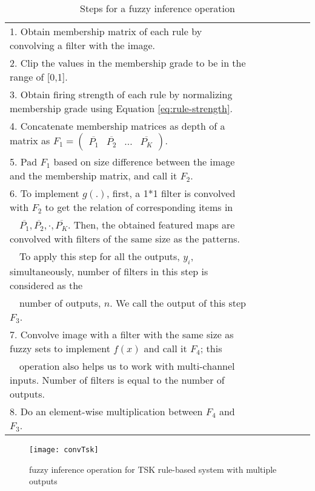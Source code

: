 \documentclass{article}
\begin{document}
\begin{table*}[tb]
\caption{Steps for a fuzzy inference operation}
\label{tab:fuzzyConvOp}
\vskip 0.15in
\begin{center}
\begin{small}
\begin{tabular}{lcccccr}
\toprule
1. Obtain membership matrix of each rule by convolving a filter with the image. \\
2. Clip the values in the membership grade to be in the range of [0,1]. \\
3. Obtain firing strength of each rule by normalizing membership grade using Equation \ref{eq:rule-strength}. \\
4. Concatenate membership matrices as depth of a matrix as $F_1=\begin{pmatrix} \overline{P_1} & \overline{P_2} & ... &\overline{P_K} \end{pmatrix}$. \\
5. Pad $F_1$ based on size difference between the image and the membership matrix, and call it $F_2$. \\
6. To implement $g(.)$, first, a 1*1 filter is convolved with $F_2$ to get the relation of corresponding items in \\ \-\ \-\ $\overline{P_1}, \overline{P_2}, \cdot, \overline{P_K}$. Then, the obtained featured maps are convolved with filters of the same size as the patterns. \\ \-\ \-\ To apply this step for all the outputs, $y_i$,  simultaneously, number of filters in this step is considered as the \\ \-\ \-\  number of outputs, $n$. We call the output of this step $F_3$. \\
7. Convolve image with a filter with the same size as fuzzy sets to implement $f(x)$ and call it $F_4$; this \\ \-\ \-\ operation also helps us to work with multi-channel inputs. Number of filters is equal to the number of outputs. \\
8. Do an element-wise multiplication between $F_4$ and $F_3$. \\
\bottomrule
\end{tabular}
\end{small}
\end{center}
\vskip -0.1in
\end{table*}

\begin{figure*}[ht]
\vskip 0.2in
\begin{center}
\centerline{\texttt{[image: convTsk]}}
\caption{fuzzy inference operation for TSK rule-based system with multiple outputs}
\label{fig:convTsk}
\end{center}
\vskip -0.2in
\end{figure*}
\end{document}
